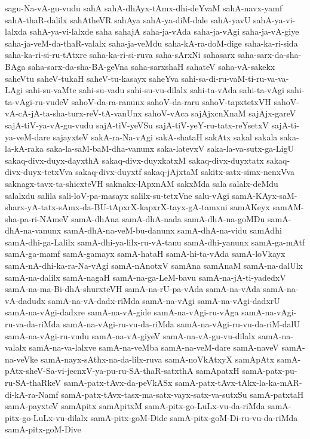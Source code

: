 {sagu-Na-vA-gu-vudu
sahA
sahA-dhAyx-tAmx-dhi-deYvaM
sahA-navx-yamf
sahA-thaR-dalilx
sahAtheVR
sahAya
sahA-ya-diM-dale
sahA-yavU
sahA-ya-vi-lalxda
sahA-ya-vi-lalxde
saha
sahajA
saha-ja-vAda
saha-ja-vAgi
saha-ja-vA-giye
saha-ja-veM-da-thaR-valalx
saha-ja-veMdu
saha-kA-ra-doM-dige
saha-ka-ri-sida
saha-ka-ri-si-ru-tAtxre
saha-ka-ri-si-ruva
saha-sArxNi
sahasarx
saha-sarx-da-sha-BAga
saha-sarx-da-sha-BA-geVna
saha-sarxshaH
sahateV
saha-vA-sakekx
saheVtu
saheV-tukaH
saheV-tu-kasayx
saheYva
sahi-sa-di-ru-vaM-ti-ru-va-va-LAgi
sahi-su-vaMte
sahi-su-vadu
sahi-su-vu-dilalx
sahi-ta-vAda
sahi-ta-vAgi
sahi-ta-vAgi-ru-vudeV
sahoV-da-ra-ranunx
sahoV-da-raru
sahoV-tapxtetxVH
sahoV-vA-cA-jA-ta-sha-turx-reV-tA-vanUnx
sahoV-vAca
sajAjxcnXnaM
sajAjx-gareV
sajA-tiV-ya-vA-gu-vudu
sajA-tiV-yeVSu
sajA-tiV-yeY-ru-tatx-reYsetxV
sajA-ti-ya-veM-dare
sajayxteV
sakA-ra-Na-vAgi
sakA-shataH
sakAtx
sakal
sakala
saka-la-kA-raka
saka-la-saM-baM-dha-vanunx
saka-latevxV
saka-la-va-sutx-ga-LigU
sakaq-divx-duyx-dayxthA
sakaq-divx-duyxkatxM
sakaq-divx-duyxtatx
sakaq-divx-duyx-tetxVva
sakaq-divx-duyxtf
sakaq-jAjxtaM
sakitx-satx-simx-nenxVva
saknagx-tavx-ta-shicxteVH
saknakx-lApxnAM
sakxMda
sala
salalx-deMdu
salalxdu
salila
sali-loV-pa-masayx
salilx-su-tetxVne
salu-vAgi
samA-KAyx-saM-sharx-yA-tatx-sAmx-da-BU-tApxrX-kapxrX-tayx-gA-tamxni
samAKeyx
samAM-sha-pa-ri-NAmeV
samA-dhAna
samA-dhA-nada
samA-dhA-na-goMDu
samA-dhA-na-vanunx
samA-dhA-na-veM-bu-danunx
samA-dhA-na-vidu
samAdhi
samA-dhi-ga-Lalilx
samA-dhi-ya-lilx-ru-vA-tanu
samA-dhi-yanunx
samA-ga-mAtf
samA-ga-mamf
samA-gamayx
samA-hataH
samA-hi-ta-vAda
samA-loVkayx
samA-nA-dhi-ka-ra-Na-vAgi
samA-nAnotxV
samAna
samAnaM
samA-na-dalUlx
samA-na-dalilx
samA-nagaH
samA-na-ga-LeM-bavu
samA-na-jA-ti-yadedxV
samA-na-ma-Bi-dhA-shurxteVH
samA-na-rU-pa-vAda
samA-na-vAda
samA-na-vA-dadudx
samA-na-vA-dadx-riMda
samA-na-vAgi
samA-na-vAgi-dadxrU
samA-na-vAgi-dadxre
samA-na-vA-gide
samA-na-vAgi-ru-vAga
samA-na-vAgi-ru-va-da-riMda
samA-na-vAgi-ru-vu-da-riMda
samA-na-vAgi-ru-vu-da-riM-dalU
samA-na-vAgi-ru-vudu
samA-na-vA-giyeV
samA-na-vA-gu-vu-dilalx
samA-na-valalx
samA-na-va-lalxve
samA-na-veMba
samA-na-veM-dare
samA-naveV
samA-na-veVke
samA-nayx-sAthx-na-da-lilx-ruva
samA-noVkAtxyX
samApAtx
samA-pAtx-sheV-Sa-vi-jecnxV-ya-pu-ru-SA-thaR-satxthA
samApatxH
samA-patx-pu-ru-SA-thaRkeV
samA-patx-tAvx-da-peVkASx
samA-patx-tAvx-tAkx-la-ka-mAR-di-kA-ra-Namf
samA-patx-tAvx-tasx-ma-satx-vayx-satx-va-sutxSu
samA-patxtaH
samA-payxteV
samApitx
samApitxM
samA-pitx-go-LuLx-vu-da-riMda
samA-pitx-go-LuLx-vu-dilalx
samA-pitx-goM-Dide
samA-pitx-goM-Di-ru-vu-da-riMda
samA-pitx-goM-Dive
}
